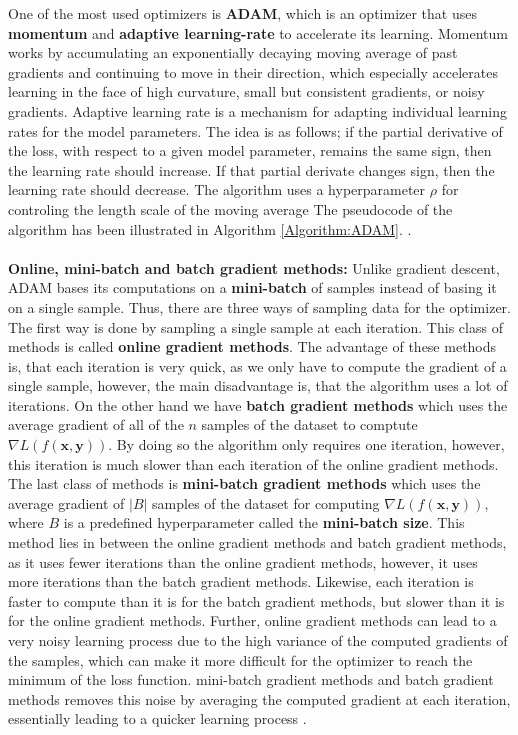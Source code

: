 \documentclass[./main.tex]{subfiles}
\begin{document}
One of the most used optimizers is \textbf{ADAM}, which is an optimizer that uses \textbf{momentum} and \textbf{adaptive learning-rate} to accelerate its learning. Momentum works by accumulating an exponentially decaying moving average of past gradients and continuing to move in their direction, which especially accelerates learning in the face of high curvature, small but consistent gradients, or noisy gradients. Adaptive learning rate is a mechanism for adapting individual learning rates for the model parameters. The idea is as follows; if the partial derivative of the loss, with respect to a given model parameter, remains the same sign, then the learning rate should increase. If that partial derivate changes sign, then the learning rate should decrease. The algorithm uses a hyperparameter $\rho$ for controling the length scale of the moving average The pseudocode of the algorithm has been illustrated in Algorithm \ref{Algorithm:ADAM}. \cite{DL_book}. 
\\
\\
\noindent \textbf{Online, mini-batch and batch gradient methods:} Unlike gradient descent, ADAM bases its computations on a \textbf{mini-batch} of samples instead of basing it on a single sample. Thus, there are three ways of sampling data for the optimizer. The first way is done by sampling a single sample at each iteration. This class of methods is called \textbf{online gradient methods}. The advantage of these methods is, that each iteration is very quick, as we only have to compute the gradient of a single sample, however, the main disadvantage is, that the algorithm uses a lot of iterations. On the other hand we have \textbf{batch gradient methods} which uses the average gradient of all of the $n$ samples of the dataset to comptute $\nabla L(f(\bm{x}, \bm{y}))$. By doing so the algorithm only requires one iteration, however, this iteration is much slower than each iteration of the online gradient methods. The last class of methods is \textbf{mini-batch gradient methods} which uses the average gradient of $|B|$ samples of the dataset for computing $\nabla L(f(\bm{x}, \bm{y}))$, where $B$ is a predefined hyperparameter called the \textbf{mini-batch size}. This method lies in between the online gradient methods and batch gradient methods, as it uses fewer iterations than the online gradient methods, however, it uses more iterations than the batch gradient methods. Likewise, each iteration is faster to compute than it is for the batch gradient methods, but slower than it is for the online gradient methods. Further, online gradient methods can lead to a very noisy learning process due to the high variance of the computed gradients of the samples, which can make it more difficult for the optimizer to reach the minimum of the loss function. mini-batch gradient methods and batch gradient methods removes this noise by averaging the computed gradient at each iteration, essentially leading to a quicker learning process \cite{DL_book}. 
\end{document}
